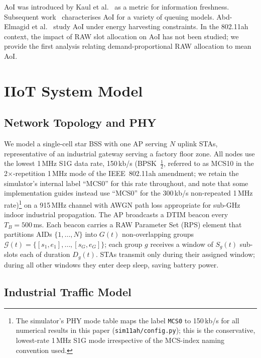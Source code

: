 \documentclass[journal]{IEEEtran}
\begin{document}
AoI was introduced by Kaul et al.~\cite{kaul2012aoi} as a metric for
information freshness.
Subsequent work~\cite{yates2021aoi} characterises AoI for a variety
of queuing models.
Abd-Elmagid et al.~\cite{abdelmagid2019aoi} study AoI under energy
harvesting constraints.
In the 802.11ah context, the impact of RAW slot allocation on AoI
has not been studied; we provide the first analysis relating
demand-proportional RAW allocation to mean AoI.

\section{IIoT System Model}
\label{sec:model}

\subsection{Network Topology and PHY}

We model a single-cell star BSS with one AP serving $N$ uplink STAs,
representative of an industrial gateway serving a factory floor zone.
All nodes use the lowest 1\,MHz S1G data rate, 150\,kb/s
(BPSK~$\frac{1}{2}$, referred to as MCS10 in the 2$\times$-repetition
1\,MHz mode of the IEEE~802.11ah amendment; we retain the simulator's
internal label ``MCS0'' for this rate throughout, and note that some
implementation guides instead use ``MCS0'' for the 300\,kb/s
non-repeated 1\,MHz rate)\footnote{The simulator's PHY mode table maps
the label \texttt{MCS0} to 150\,kb/s for all numerical results in this
paper (\texttt{sim11ah/config.py}); this is the conservative,
lowest-rate 1\,MHz S1G mode irrespective of the MCS-index naming
convention used.} on a 915\,MHz
channel with AWGN path loss appropriate for sub-GHz indoor industrial
propagation.
The AP broadcasts a DTIM beacon every $T_B\!=\!500$\,ms.
Each beacon carries a RAW Parameter Set (RPS) element that partitions
AIDs $\{1,\ldots,N\}$ into $G(t)$ non-overlapping groups
$\mathcal{G}(t)=\{[s_1,e_1],\ldots,[s_G,e_G]\}$; each group $g$
receives a window of $S_g(t)$ sub-slots each of duration $D_g(t)$.
STAs transmit only during their assigned window; during all other
windows they enter deep sleep, saving battery power.

\subsection{Industrial Traffic Model}
\end{document}
